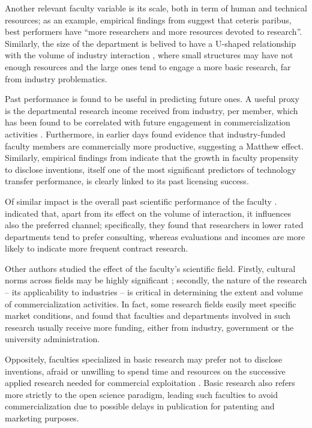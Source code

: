 Another relevant faculty variable is its scale, both in term of human and technical resources; as an example, empirical findings from \citet{OwenSmith2001} suggest that ceteris paribus, best performers have \enquote{more researchers and more resources devoted to research}. Similarly, the size of the department is belived to have a U-shaped relationship with the volume of industry interaction \citep{DEste2007}, where small structures may have not enough resources and the large ones tend to engage a more basic research, far from industry problematics.

Past performance is found to be useful in predicting future ones. A useful proxy is the departmental research income received from industry, per member, which has been found to be correlated with future engagement in commercialization activities \citep{DEste2007}. Furthermore, \citet{Blumenthal1996} in earlier days found evidence that industry-funded faculty members are commercially more productive, suggesting a Matthew effect. Similarly, empirical findings from \citet{Thursby2002} indicate that the growth in faculty propensity to disclose inventions, itself one of the most significant predictors of technology transfer performance, is clearly linked to its past licensing success. 

Of similar impact is the overall past scientific performance of the faculty \citep{OShea2005}. \citet{DEste2011} indicated that, apart from its effect on the volume of interaction, it influences also the preferred channel; specifically, they found that researchers in lower rated departments tend to prefer consulting, whereas evaluations and incomes are more likely to indicate more frequent contract research.

Other authors studied the effect of the faculty's scientific field. Firstly, cultural norms across fields may be highly significant \citep{DEste2007}; secondly, the nature of the research – its applicability to industries – is critical in determining the extent and volume of commercialization activities. In fact, some research fields easily meet specific market conditions, and \citet{OShea2005} found that faculties and departments involved in such research usually receive more funding, either from industry, government or the university administration.

Oppositely, faculties specialized in basic research may prefer not to disclose inventions, afraid or unwilling to spend time and resources on the successive applied research needed for commercial exploitation \citep{Bercovitz2006}. Basic research also refers more strictly to the open science paradigm, leading such faculties to avoid commercialization due to possible delays in publication for patenting and marketing purposes. 

